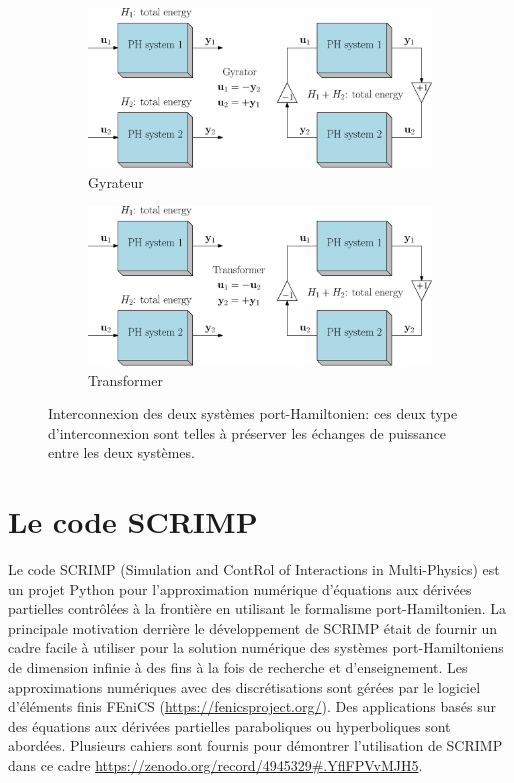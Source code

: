 \documentclass[12pt, french]{article}
\begin{document}
	\begin{figure}[b]
	\begin{subfigure}[t]{0.45\textwidth}
		\includegraphics[width=\columnwidth]{sketch_PH_gyrator.eps} 
		\caption{Gyrateur}
		\label{fig:pHsys_gyr}
	\end{subfigure}\hfill
	\begin{subfigure}[t]{0.45\textwidth}
		\includegraphics[width=\columnwidth]{sketch_PH_transformer.eps}%
		\caption{Transformer}
		\label{fig:pHsys_tran}
	\end{subfigure}
	\caption[]{Interconnexion des deux systèmes port-Hamiltonien: ces deux type d'interconnexion sont telles \`a préserver les échanges de puissance entre les deux systèmes.}%
	\label{fig:intPH}%
\end{figure}


\section{Le code SCRIMP}\label{sec:SCRIMP}
Le code SCRIMP (Simulation and ContRol of Interactions in Multi-Physics) est un projet Python pour l'approximation numérique d'équations aux dérivées partielles contrôlées \`a la frontière en utilisant le formalisme port-Hamiltonien. La principale motivation derrière le développement de SCRIMP était de fournir un cadre facile à utiliser pour la solution numérique des systèmes port-Hamiltoniens de dimension infinie à des fins à la fois de recherche et d'enseignement. Les approximations numériques avec des discrétisations sont gérées par le logiciel d'éléments finis FEniCS (\url{https://fenicsproject.org/}). Des applications basés sur des équations aux dérivées partielles paraboliques ou hyperboliques sont abordées. Plusieurs cahiers sont fournis pour démontrer l'utilisation de SCRIMP dans ce cadre \url{https://zenodo.org/record/4945329\#.YflFPVvMJH5}.
\end{document}
